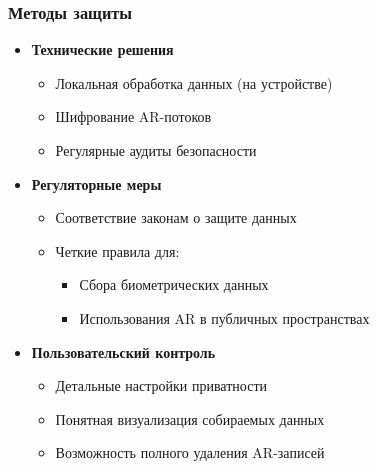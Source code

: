 \subsubsection{Методы защиты}
\begin{itemize}
    \item \textbf{Технические решения}
    \begin{itemize}
        \item Локальная обработка данных (на устройстве)
        \item Шифрование AR-потоков
        \item Регулярные аудиты безопасности
    \end{itemize}
    
    \item \textbf{Регуляторные меры}
    \begin{itemize}
        \item Соответствие законам о защите данных
        \item Четкие правила для:
        \begin{itemize}
            \item Сбора биометрических данных
            \item Использования AR в публичных пространствах
        \end{itemize}
    \end{itemize}
    
    \item \textbf{Пользовательский контроль}
    \begin{itemize}
        \item Детальные настройки приватности
        \item Понятная визуализация собираемых данных
        \item Возможность полного удаления AR-записей
    \end{itemize}
\end{itemize}


